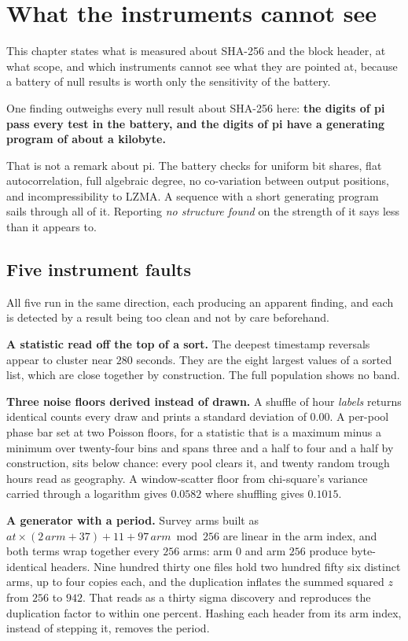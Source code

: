 \chapter{What the instruments cannot see}

This chapter states what is measured about SHA-256 and the block header, at what scope, and which instruments cannot see what they are pointed at, because a battery of null results is worth only the sensitivity of the battery.

One finding outweighs every null result about SHA-256 here: \textbf{the digits of pi pass every test in the battery, and the digits of pi have a generating program of about a kilobyte.}

That is not a remark about pi. The battery checks for uniform bit shares, flat autocorrelation, full algebraic degree, no co-variation between output positions, and incompressibility to LZMA. A sequence with a short generating program sails through all of it. Reporting \emph{no structure found} on the strength of it says less than it appears to.

\section{Five instrument faults}

All five run in the same direction, each producing an apparent finding, and each is detected by a result being too clean and not by care beforehand.

\textbf{A statistic read off the top of a sort.} The deepest timestamp reversals appear to cluster near \(280\) seconds. They are the eight largest values of a sorted list, which are close together by construction. The full population shows no band.

\textbf{Three noise floors derived instead of drawn.} A shuffle of hour \emph{labels} returns identical counts every draw and prints a standard deviation of \(0.00\). A per-pool phase bar set at two Poisson floors, for a statistic that is a maximum minus a minimum over twenty-four bins and spans three and a half to four and a half by construction, sits below chance: every pool clears it, and twenty random trough hours read as geography. A window-scatter floor from chi-square's variance carried through a logarithm gives \(0.0582\) where shuffling gives \(0.1015\).

\textbf{A generator with a period.} Survey arms built as \(\mathit{at} \times (2\,\mathit{arm} + 37) + 11 + 97\,\mathit{arm} \bmod 256\) are linear in the arm index, and both terms wrap together every \(256\) arms: arm \(0\) and arm \(256\) produce byte-identical headers. Nine hundred thirty one files hold two hundred fifty six distinct arms, up to four copies each, and the duplication inflates the summed squared \(z\) from \(256\) to \(942\). That reads as a thirty sigma discovery and reproduces the duplication factor to within one percent. Hashing each header from its arm index, instead of stepping it, removes the period.

